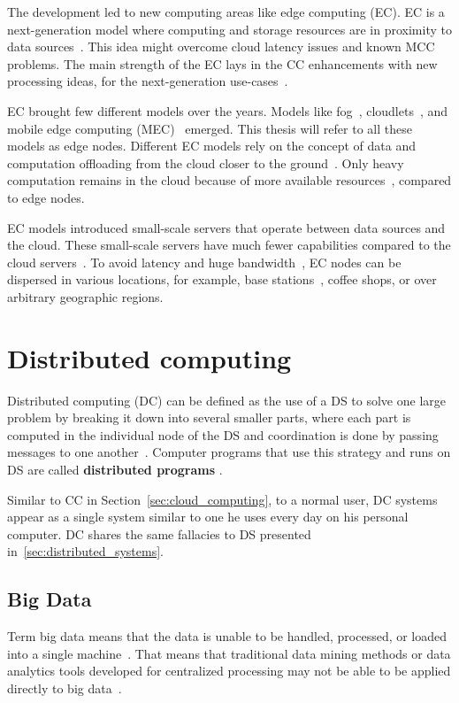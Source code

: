 The development led to new computing areas like edge computing (EC). EC is a next-generation model where computing and storage resources are in proximity to data sources~\cite{Satyanarayanan17}. This idea might overcome cloud latency issues and known MCC problems. The main strength of the EC lays in the CC enhancements with new processing ideas, for the next-generation use-cases~\cite{NingLSY20}. 

EC brought few different models over the years. Models like fog~\cite{BonomiMNZ14}, cloudlets~\cite{MonsalveCC18}, and mobile edge computing (MEC)~\cite{WangZZWYW17} emerged. This thesis will refer to all these models as edge nodes. Different EC models rely on the concept of data and computation offloading from the cloud closer to the ground~\cite{KhuneP19}. Only heavy computation remains in the cloud because of more available resources~\cite{NingLSY20}, compared to edge nodes. 

EC models introduced small-scale servers that operate between data sources and the cloud. These small-scale servers have much fewer capabilities compared to the cloud servers~\cite{ChenHLLW15}. To avoid latency and huge bandwidth~\cite{MonsalveCC18}, EC nodes can be dispersed in various locations, for example, base stations~\cite{WangZZWYW17}, coffee shops, or over arbitrary geographic regions.
%
%
\section{Distributed computing}\label{sec:distributed_computing}
%
Distributed computing (DC) can be defined as the use of a DS to solve one large problem by breaking it down into several smaller parts, where each part is computed in the individual node of the DS and coordination is done by passing messages to one another~\cite{0019513}. Computer programs that use this strategy and runs on DS are called \textbf{distributed programs} \cite{Vera16, andrews2000foundations}. 

Similar to CC in Section~\ref{sec:cloud_computing}, to a normal user, DC systems appear as a single system similar to one he uses every day on his personal computer. DC shares the same fallacies to DS presented in~\ref{sec:distributed_systems}.
%
%
\subsection{Big Data}\label{sec:big_data}
%
Term big data means that the data is unable to be handled, processed, or loaded into a single machine~\cite{FisherDCD12}. That means that traditional data mining methods or data analytics tools developed for centralized processing may not be able to be applied directly to big data~\cite{Tsai2015}. 

